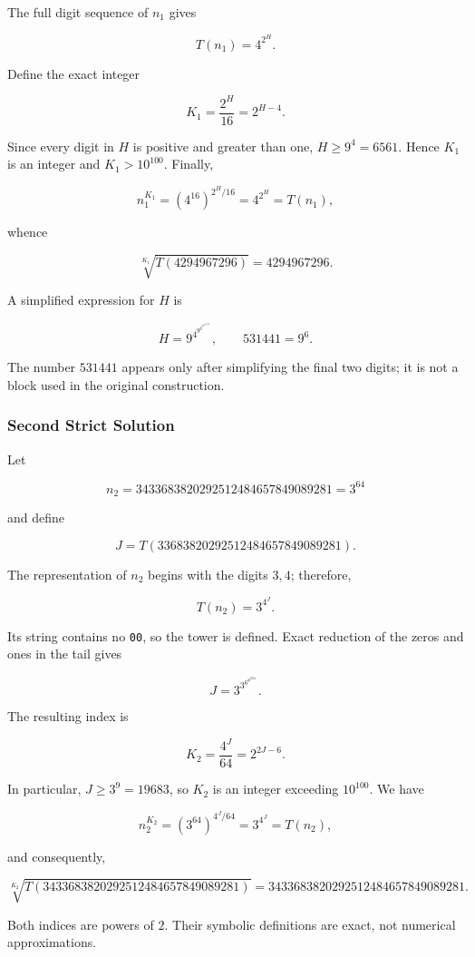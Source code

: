 \documentclass[11pt,a4paper]{article}
\begin{document}
The full digit sequence of $n_1$ gives

\[
T(n_1)=4^{2^H}.
\]

Define the exact integer

\[
K_1=\frac{2^H}{16}=2^{H-4}.
\]

Since every digit in $H$ is positive and greater than one, $H\geq9^4=6561$. Hence $K_1$ is an integer and $K_1>10^{100}$. Finally,

\[
n_1^{K_1}=(4^{16})^{2^H/16}=4^{2^H}=T(n_1),
\]

whence

\[
\boxed{\sqrt[K_1]{T(4294967296)}=4294967296.}
\]

A simplified expression for $H$ is

\[
H=9^{4^{9^{6^{7^{2^{531441}}}}}},\qquad 531441=9^6.
\]

The number $531441$ appears only after simplifying the final two digits; it is not a block used in the original construction.

\subsubsection{Second Strict Solution}

Let

\[
n_2=3433683820292512484657849089281=3^{64}
\]

and define

\[
J=T(33683820292512484657849089281).
\]

The representation of $n_2$ begins with the digits $3,4$; therefore,

\[
T(n_2)=3^{4^J}.
\]

Its string contains no \texttt{00}, so the tower is defined. Exact reduction of the zeros and ones in the tail gives

\[
J=3^{3^{6^{8^{6561}}}}.
\]

The resulting index is

\[
K_2=\frac{4^J}{64}=2^{2J-6}.
\]

In particular, $J\geq3^9=19683$, so $K_2$ is an integer exceeding $10^{100}$. We have

\[
n_2^{K_2}=(3^{64})^{4^J/64}=3^{4^J}=T(n_2),
\]

and consequently,

\[
\boxed{\sqrt[K_2]{T(3433683820292512484657849089281)}
=3433683820292512484657849089281.}
\]

Both indices are powers of $2$. Their symbolic definitions are exact, not numerical approximations.
\end{document}
